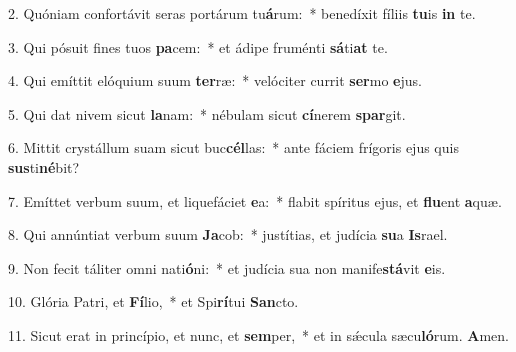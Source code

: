 \item 2. Quóniam confortávit seras portárum tu\textbf{á}rum:~* benedíxit fíliis \textbf{tu}is \textbf{in} te.
\item 3. Qui pósuit fines tuos \textbf{pa}cem:~* et ádipe fruménti \textbf{sá}ti\textbf{at} te.
\item 4. Qui emíttit elóquium suum \textbf{ter}ræ:~* velóciter currit \textbf{ser}mo \textbf{e}jus.
\item 5. Qui dat nivem sicut \textbf{la}nam:~* nébulam sicut \textbf{cí}nerem \textbf{spar}git.
\item 6. Mittit crystállum suam sicut buc\textbf{cél}las:~* ante fáciem frígoris ejus quis \textbf{sus}ti\textbf{né}bit?
\item 7. Emíttet verbum suum, et liquefáciet \textbf{e}a:~* flabit spíritus ejus, et \textbf{flu}ent \textbf{a}quæ.
\item 8. Qui annúntiat verbum suum \textbf{Ja}cob:~* justítias, et judícia \textbf{su}a \textbf{Is}rael.
\item 9. Non fecit táliter omni nati\textbf{ó}ni:~* et judícia sua non manife\textbf{stá}vit \textbf{e}is.
\item 10. Glória Patri, et \textbf{Fí}lio,~* et Spi\textbf{rí}tui \textbf{San}cto.
\item 11. Sicut erat in princípio, et nunc, et \textbf{sem}per,~* et in sǽcula sæcu\textbf{ló}rum. \textbf{A}men.
